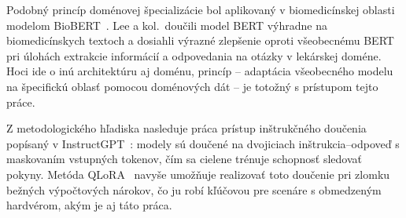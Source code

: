 Podobný princíp doménovej špecializácie bol aplikovaný v biomedicínskej oblasti modelom BioBERT~\cite{Lee2020BioBERT}. Lee a kol.\ doučili model BERT výhradne na biomedicínskych textoch a dosiahli výrazné zlepšenie oproti všeobecnému BERT pri úlohách extrakcie informácií a odpovedania na otázky v lekárskej doméne. Hoci ide o inú architektúru aj doménu, princíp -- adaptácia všeobecného modelu na špecifickú oblasť pomocou doménových dát -- je totožný s prístupom tejto práce.

Z metodologického hľadiska nasleduje práca prístup inštrukčného doučenia popísaný v InstructGPT~\cite{Ouyang2022InstructGPT}: modely sú doučené na dvojiciach inštrukcia--odpoveď s maskovaním vstupných tokenov, čím sa cielene trénuje schopnosť sledovať pokyny. Metóda QLoRA~\cite{Dettmers2023QLoRA} navyše umožňuje realizovať toto doučenie pri zlomku bežných výpočtových nárokov, čo ju robí kľúčovou pre scenáre s obmedzeným hardvérom, akým je aj táto práca.
